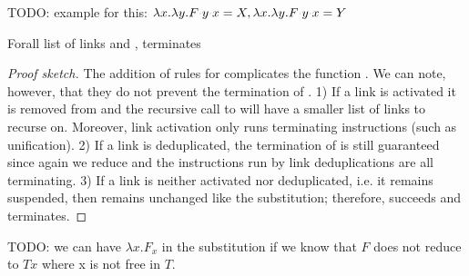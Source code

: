 \documentclass[sigconf,natbib=false,review]{acmart}
\newcommand{\appsep}{\ensuremath{\textcolor{lightgray}{\cdot}}}
\newcommand{\UnifRel}{\ensuremath{\simeq}}
\newcommand{\Ue}{\ensuremath{\UnifRel_\lambda}\xspace}
\begin{document}
TODO: example for this: $\lambda x. \lambda y. F \appsep y \appsep x = X,
\lambda x. \lambda y. F \appsep y \appsep x = Y$

\begin{lemma}
  Forall list of links  and , 
  terminates
\end{lemma}

\begin{proof}[Proof sketch]
  The addition of rules for  complicates the function
  . We can note, however, that they do not prevent the
  termination of . 1) If a link is activated it is removed from
  \linkStore and the recursive call to  will have a smaller
  list of links to recurse on. Moreover, link activation only runs terminating
  instructions (such as unification). 2) If a link is deduplicated, the
  termination of  is still guaranteed since again we reduce
  \linkStore and the instructions run by link deduplications are all
  terminating. 3) If a link is neither activated nor deduplicated, i.e. it
  remains suspended, then \linkStore remains unchanged like the substitution;
  therefore,  succeeds and 
  terminates.
\end{proof}

TODO: we can have $\lambda x. F_x$ in the substitution if we know that $F$ does
not reduce to $T x$ where x is not free in $T$.


\end{document}
